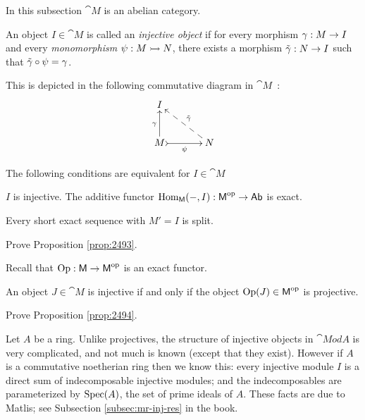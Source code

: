 In this subsection $\cat{M}$ is an abelian category.

\begin{dfn}
An object $I \in \cat{M}$ is called an 
{\em injective object}%
if for every morphism $\gamma : M \to I$ and every {\em monomorphism} 
$\psi : M \rightarrowtail N$, there exists a morphism 
$\tilde{\gamma} : N \to I$ such that 
$\tilde{\gamma} \circ \psi = \gamma$. 
\end{dfn}

This is depicted in the following commutative diagram in 
$\cat{M}$~:
\[ \UseTips  \xymatrix @C=8ex @R=6ex {
I
\\
M 
\ar[u]^{\ga}
\ar@{>->}[r]_{\psi}
&
N
\ar@{-->}[ul]_{\til{\ga}}
} \]


\begin{prop} \label{prop:2493}
The following conditions are equivalent for $I \in \cat{M}$\tup{:}
\begin{enumerate}
 $I$ is injective.
 The additive functor 
$\operatorname{Hom}_{\operatorname{\mathsf{M}}}(-, I) : \operatorname{\mathsf{M}}^{\mathrm{op}} \to \operatorname{\mathsf{Ab}}$
is exact.

 Every short exact sequence \tup{(\ref{eqn:1035})} with 
$M' = I$ is split.
\end{enumerate}
\end{prop}

\begin{exer}
Prove  Proposition \ref{prop:2493}.
\end{exer}

Recall that $\operatorname{Op} : \operatorname{\mathsf{M}} \to \operatorname{\mathsf{M}}^{\mathrm{op}}$ is an exact functor. 

\begin{prop} \label{prop:2494}
An object $J \in \cat{M}$ is injective if and only if the object 
$\operatorname{Op}(J) \in \operatorname{\mathsf{M}}^{\mathrm{op}}$ is projective. 
\end{prop}

\begin{exer}
Prove Proposition \ref{prop:2494}. 
\end{exer}

\begin{exa}
Let $A$ be a ring. Unlike projectives, the structure of injective objects in
$\cat{Mod} A$ is very complicated, and not much is known (except that they
exist). However if $A$ is a commutative noetherian ring then we know this:
every injective module $I$ is a direct sum of indecomposable injective 
modules; and the indecomposables are parameterized by $\operatorname{Spec}(A)$, the 
set of prime ideals of $A$. 
These facts are due to Matlis; see Subsection \ref{subsec:mr-inj-res} in the 
book. 
\end{exa}

